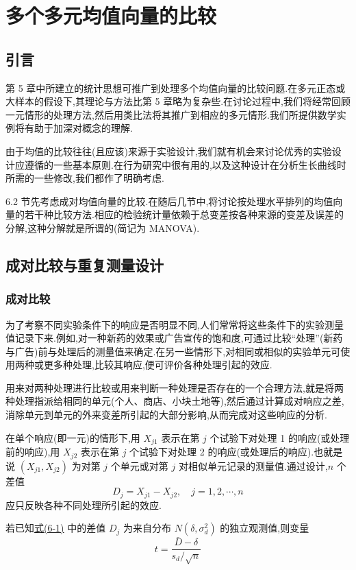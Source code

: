 \chapter{多个多元均值向量的比较}
\label{chap:6}

\section{引言}
\label{sec:6.1}

第 5 章中所建立的统计思想可推广到处理多个均值向量的比较问题.在多元正态或大样本的假设下,其理论与方法比第 5 章略为复杂些.在讨论过程中,我们将经常回顾一元情形的处理方法,然后用类比法将其推广到相应的多元情形.我们所提供数学实例将有助于加深对概念的理解.

由于均值的比较往往(且应该)来源于实验设计,我们就有机会来讨论优秀的实验设计应遵循的一些基本原则.在行为研究中很有用的,以及这种设计在分析生长曲线时所需的一些修改,我们都作了明确考虑.

6.2 节先考虑成对均值向量的比较.在随后几节中,将讨论按处理水平排列的均值向量的若干种比较方法.相应的检验统计量依赖于总变差按各种来源的变差及误差的分解,这种分解就是所谓的(简记为 MANOVA).

\section{成对比较与重复测量设计}
\label{sec:6.2}

\subsection{成对比较}

为了考察不同实验条件下的响应是否明显不同,人们常常将这些条件下的实验测量值记录下来.例如,对一种新药的效果或广告宣传的饱和度,可通过比较``处理''(新药与广告)前与处理后的测量值来确定.在另一些情形下,对相同或相似的实验单元可使用两种或更多种处理,比较其响应,便可评价各种处理引起的效应.

用来对两种处理进行比较或用来判断一种处理是否存在的一个合理方法,就是将两种处理指派给相同的单元(个人、商店、小块土地等),然后通过计算成对响应之差,消除单元到单元的外来变差所引起的大部分影响,从而完成对这些响应的分析.

在单个响应(即一元)的情形下,用 $X_{j1}$ 表示在第 $j$ 个试验下对处理 1 的响应(或处理前的响应),用 $X_{j2}$ 表示在第 $j$ 个试验下对处理 2 的响应(或处理后的响应).也就是说 $(X_{j1},X_{j2})$ 为对第 $j$ 个单元或对第 $j$ 对相似单元记录的测量值.通过设计,$n$ 个差值
\label{eq:6-1}
\begin{equation}
D_j = X_{j1} - X_{j2},\quad j = 1,2,\cdots,n \tag{6-1}
\end{equation}
应只反映各种不同处理所引起的效应.

若已知\hyperref[eq:6-1]{式(6-1)} 中的差值 $D_j$ 为来自分布 $N(\delta,\sigma_d^2)$ 的独立观测值,则变量
\label{eq:6-2}
\begin{equation}
t = \frac{\bar{D} - \delta}{s_d/\sqrt{n}} \tag{6-2}
\end{equation}

